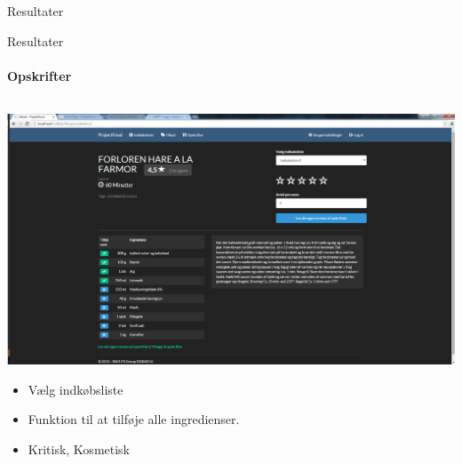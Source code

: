 \begin{frame}{Resultater}
\begin{minipage}[0.3\textheight]{\textwidth}
  \end{minipage}
  
  	
\end{frame}

\begin{frame}{Resultater}
\framesubtitle{Opskrifter}

	
	\begin{minipage}[0.3\textheight]{\textwidth}
	\begin{columns}[T]
	\begin{column}{1\textwidth}
	 \includegraphics[width=1\textwidth,height=1\textheight,keepaspectratio, trim={1cm 0 0 16mm}, clip]{images/Screenshots/PickedRecipeOld.png}
	 
		\begin{itemize}
		\item Vælg indkøbsliste
		\item Funktion til at tilføje alle ingredienser.
		\item Kritisk, Kosmetisk
		\end{itemize}
	\end{column}

	\end{columns}

  \end{minipage}
	
\end{frame}

